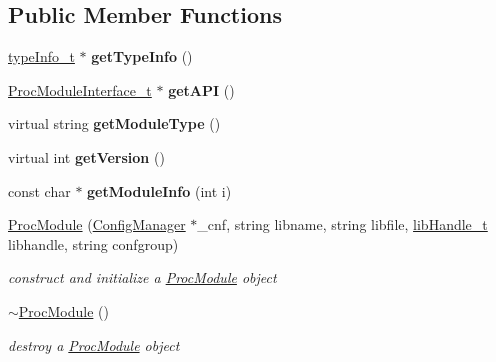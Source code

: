 \subsection*{Public Member Functions}
\begin{DoxyCompactItemize}
\item 
\mbox{\label{classProcModule_a780d31e8458d25ea9ba7004d044509dd}} 
\hyperlink{structtypeInfo__t}{type\+Info\+\_\+t} $\ast$ {\bfseries get\+Type\+Info} ()
\item 
\mbox{\label{classProcModule_a3bba66dde9395f27cc4f8982282e2b54}} 
\hyperlink{structProcModuleInterface__t}{Proc\+Module\+Interface\+\_\+t} $\ast$ {\bfseries get\+A\+PI} ()
\item 
\mbox{\label{classProcModule_a7b53fc4aab791ebf29caf709720b95f2}} 
virtual string {\bfseries get\+Module\+Type} ()
\item 
\mbox{\label{classProcModule_aedb442504493c7d4b910ba7cc4a9c346}} 
virtual int {\bfseries get\+Version} ()
\item 
\mbox{\label{classProcModule_aef74018a555606e63d4703fc7be4b1af}} 
const char $\ast$ {\bfseries get\+Module\+Info} (int i)
\item 
\hyperlink{classProcModule_a3dcb3d64eae9628446986b254073cb4f}{Proc\+Module} (\hyperlink{classConfigManager}{Config\+Manager} $\ast$\+\_\+cnf, string libname, string libfile, \hyperlink{Module_8h_acbeb44869400b78e5f4097d5c49fc093}{lib\+Handle\+\_\+t} libhandle, string confgroup)
\begin{DoxyCompactList}\small\item\em construct and initialize a \hyperlink{classProcModule}{Proc\+Module} object \end{DoxyCompactList}\item 
\mbox{\label{classProcModule_a8f2ee6251014ab5b53e81f8f40db0205}} 
\hyperlink{classProcModule_a8f2ee6251014ab5b53e81f8f40db0205}{$\sim$\+Proc\+Module} ()
\begin{DoxyCompactList}\small\item\em destroy a \hyperlink{classProcModule}{Proc\+Module} object \end{DoxyCompactList}\item 

\end{DoxyCompactItemize}
